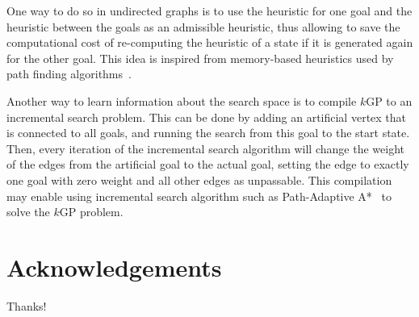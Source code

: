 \documentclass{aicom2e}
\newcommand{\kgs}{$k$GP}
\begin{document}
One way to do so in undirected graphs is to use the heuristic for one goal and the heuristic between the goals as an admissible heuristic, thus allowing to save the computational cost of re-computing the heuristic of a state if it is generated again for the other goal. This idea is inspired from memory-based heuristics used by path finding algorithms~\cite{sturtevant2007memory,sturtevant2009memory,goldenberg2011theCompressed}.

Another way to learn information about the search space is to compile \kgs{} to an incremental search problem. This can be done by adding an artificial vertex that is connected to all goals, and running the search from this goal to the start state. Then, every iteration of the incremental search algorithm will change the weight of the edges from the artificial goal to the actual goal, setting the edge to exactly one goal with zero weight and all other edges as unpassable. This compilation may enable using incremental search algorithm such as Path-Adaptive A*~\cite{hernandez2015reusing} to solve the \kgs{} problem.






\section*{Acknowledgements}
Thanks!



\end{document}
